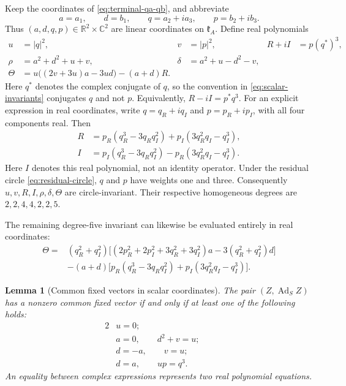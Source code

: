 \documentclass[11pt,a4paper]{article}
\newtheorem{lemma}[lemma]{Lemma}
\newcommand{\RR}{\mathbb R}
\newcommand{\CC}{\mathbb C}
\newcommand{\Ad}{\operatorname{Ad}}
\begin{document}
Keep the coordinates of \eqref{eq:terminal-qa-qb}, and abbreviate
\[
a=a_1,\qquad d=b_1,\qquad q=a_2+ia_3,\qquad p=b_2+ib_3.
\]
Thus $(a,d,q,p)\in\RR^2\times\CC^2$ are linear coordinates on $\mathfrak k_A$.  Define real polynomials
\begin{align}
u&=|q|^2, & v&=|p|^2, & R+iI&=p(q^\ast)^3,\label{eq:scalar-invariants}\\
\rho&=a^2+d^2+u+v, & \delta&=a^2+u-d^2-v,\nonumber\\
\Theta&=u\bigl((2v+3u)a-3ud\bigr)-(a+d)R.&&&&\label{eq:scalar-theta}
\end{align}
Here $q^\ast$ denotes the complex conjugate of $q$, so the convention in \eqref{eq:scalar-invariants}
conjugates $q$ and not $p$. Equivalently, $R-iI=p^\ast q^3$.
For an explicit expression in real coordinates, write
$q=q_R+iq_I$ and $p=p_R+ip_I$, with all four components real. Then
\begin{align*}
R&=p_R(q_R^3-3q_Rq_I^2)+p_I(3q_R^2q_I-q_I^3),\\
I&=p_I(q_R^3-3q_Rq_I^2)-p_R(3q_R^2q_I-q_I^3).
\end{align*}
Here $I$ denotes this real polynomial, not an identity operator.  Under the residual circle \eqref{eq:residual-circle}, $q$ and $p$ have weights one and three.  Consequently $u,v,R,I,\rho,\delta,\Theta$ are circle-invariant.  Their respective homogeneous degrees are $2,2,4,4,2,2,5$.

The remaining degree-five invariant can likewise be evaluated entirely in real coordinates:
\[
\begin{aligned}
\Theta={}&(q_R^2+q_I^2)\bigl[(2p_R^2+2p_I^2+3q_R^2+3q_I^2)a
                       -3(q_R^2+q_I^2)d\bigr]\\
 &-(a+d)\bigl[p_R(q_R^3-3q_Rq_I^2)+p_I(3q_R^2q_I-q_I^3)\bigr].
\end{aligned}
\]
\begin{lemma}[Common fixed vectors in scalar coordinates]
\label{lem:scalar-vectors}
The pair $(Z,\Ad_S Z)$ has a nonzero common fixed vector if and only if at least one of the following holds:
\begin{alignat}{2}
&u=0; &&\label{eq:vector-scalar-one}\\
&a=0,\qquad d^2+v=u; &&\label{eq:vector-scalar-two}\\
&d=-a,\qquad v=u; &&\label{eq:vector-scalar-three}\\
&d=a,\qquad up=q^3. &&\label{eq:vector-scalar-four}
\end{alignat}
An equality between complex expressions represents two real polynomial equations.
\end{lemma}
\end{document}
